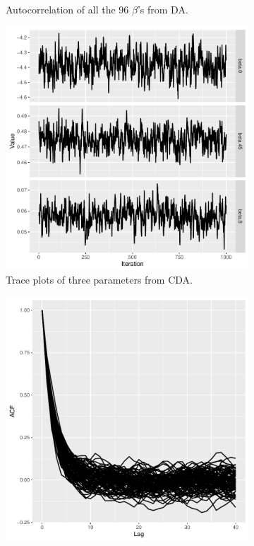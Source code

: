 \documentclass[10pt]{article}
\begin{document}
\begin{figure}[H]
\begin{subfigure}[b]{0.45\textwidth}
 \caption{Autocorrelation of all the 96 $\beta$'s from DA.}
   \label{acf_poi_da}
 \end{subfigure} 
  \begin{subfigure}[b]{0.45\textwidth}
 \includegraphics[width=1\textwidth]{traceplot_poisson_cda}
 \caption{Trace plots of three parameters from CDA.}
  \label{traceplot_poi_ada}
 \end{subfigure}
  \hfill 
 \begin{subfigure}[b]{0.45\textwidth}
 \includegraphics[width=1\textwidth]{poisson_cda_acf.pdf}

\end{subfigure}
\end{figure}
\end{document}
